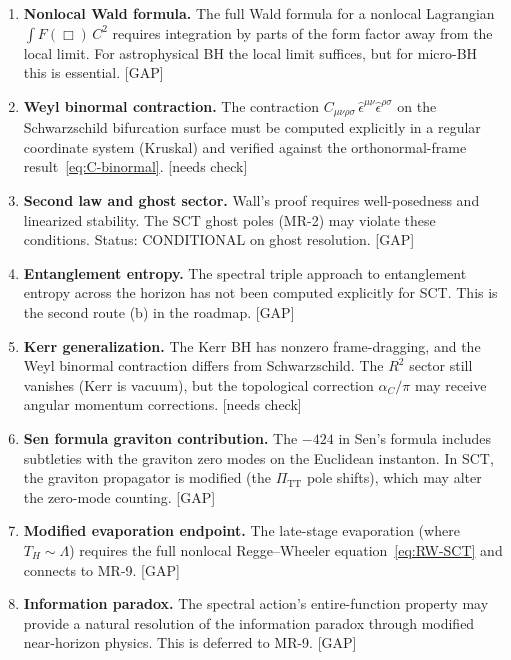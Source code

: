 \documentclass[12pt,a4paper]{article}
\theoremstyle{definition}
\theoremstyle{remark}
\newcommand{\gap}{\textcolor{red!80!black}{\textsf{[GAP]}}}
\newcommand{\needscheck}{\textcolor{orange!80!black}{\textsf{[needs check]}}}
\begin{document}
\begin{enumerate}[label=\textbf{G\arabic*:},leftmargin=3em]
  \item \textbf{Nonlocal Wald formula.}
    The full Wald formula for a nonlocal Lagrangian
    $\int F(\Box)\,C^2$ requires integration by parts of the
    form factor away from the local limit.  For astrophysical BH
    the local limit suffices, but for micro-BH this is essential.
    \gap

  \item \textbf{Weyl binormal contraction.}
    The contraction $C_{\mu\nu\rho\sigma}\,\hat{\epsilon}^{\mu\nu}
    \hat{\epsilon}^{\rho\sigma}$ on the Schwarzschild bifurcation
    surface must be computed explicitly in a regular coordinate
    system (Kruskal) and verified against the orthonormal-frame
    result~\eqref{eq:C-binormal}.  \needscheck

  \item \textbf{Second law and ghost sector.}
    Wall's proof requires well-posedness and linearized stability.
    The SCT ghost poles (MR-2) may violate these conditions.
    Status: CONDITIONAL on ghost resolution.  \gap

  \item \textbf{Entanglement entropy.}
    The spectral triple approach to entanglement entropy across
    the horizon has not been computed explicitly for SCT.  This
    is the second route (b) in the roadmap.  \gap

  \item \textbf{Kerr generalization.}
    The Kerr BH has nonzero frame-dragging, and the Weyl binormal
    contraction differs from Schwarzschild.  The $R^2$ sector still
    vanishes (Kerr is vacuum), but the topological correction
    $\alpha_C/\pi$ may receive angular momentum corrections.
    \needscheck

  \item \textbf{Sen formula graviton contribution.}
    The $-424$ in Sen's formula includes subtleties with the
    graviton zero modes on the Euclidean instanton.  In SCT, the
    graviton propagator is modified (the $\Pi_{\mathrm{TT}}$ pole
    shifts), which may alter the zero-mode counting.
    \gap

  \item \textbf{Modified evaporation endpoint.}
    The late-stage evaporation (where $T_H \sim \Lambda$) requires
    the full nonlocal Regge--Wheeler equation~\eqref{eq:RW-SCT}
    and connects to MR-9.  \gap

  \item \textbf{Information paradox.}
    The spectral action's entire-function property may provide a
    natural resolution of the information paradox through modified
    near-horizon physics.  This is deferred to MR-9.  \gap
\end{enumerate}
\end{document}
